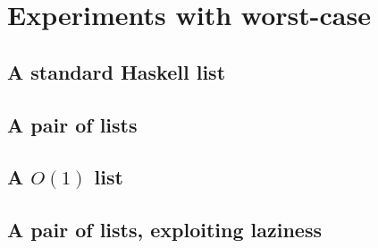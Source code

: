 \section*{Experiments with worst-case}

\subsection*{A standard Haskell list}
\subsection*{A pair of lists}
\subsection*{A $O(1)$ list}
\subsection*{A pair of lists, exploiting laziness}